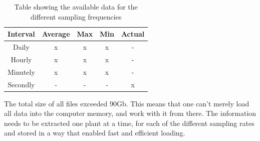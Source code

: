     \begin{table}[]
        \centering
        \begin{tabular}{c c c c c}
        
        \toprule
             \textbf{Interval}   & \textbf{Average}   & \textbf{Max}   & \textbf{Min}   & \textbf{Actual}    \\ \midrule
             Daily      & x         & x     & x     & -         \\ 
             Hourly     & x         & x     & x     & -         \\ 
             Minutely   & x         & x     & x     & -         \\ 
             Secondly   & -         & -     & -     & x         \\ \bottomrule
        \end{tabular}
        \caption{Table showing the available data for the different sampling frequencies}
        \label{tab:data_files}
    \end{table}
    
    The total size of all files exceeded $90$Gb. This means that one can't merely load all data into the computer memory, and work with it from there. The information needs to be extracted one plant at a time, for each of the different sampling rates and stored in a way that enabled fast and efficient loading.

    
